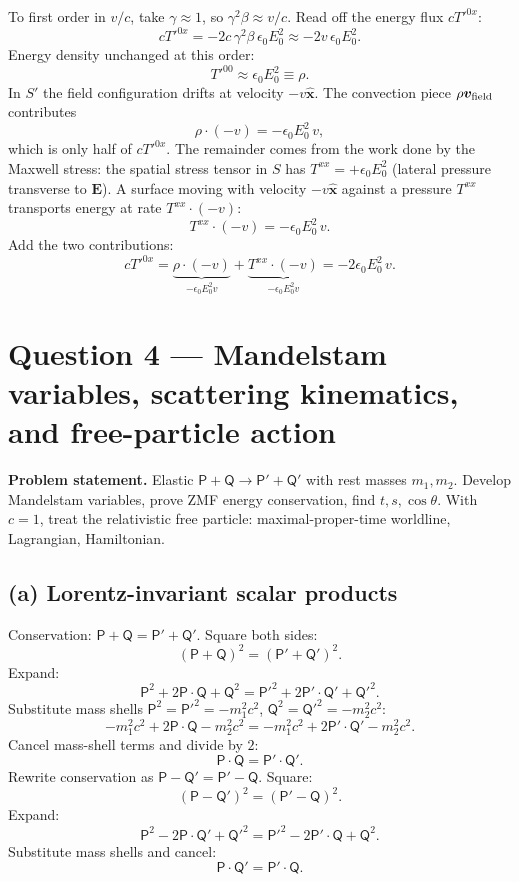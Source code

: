 \documentclass[11pt]{article}
\begin{document}
To first order in $v/c$, take $\gamma\approx 1$, so $\gamma^2\beta\approx v/c$. Read off the energy flux $cT'^{0x}$:
\[ cT'^{0x} = -2c\,\gamma^2\beta\,\epsilon_0 E_0^2 \approx -2v\,\epsilon_0 E_0^2. \]
Energy density unchanged at this order:
\[ T'^{00} \approx \epsilon_0 E_0^2 \equiv \rho. \]
In $S'$ the field configuration drifts at velocity $-v\hat{\bm x}$. The convection piece $\rho \bm v_{\rm field}$ contributes
\[ \rho\cdot(-v) = -\epsilon_0 E_0^2\,v, \]
which is only half of $cT'^{0x}$. The remainder comes from the work done by the Maxwell stress: the spatial stress tensor in $S$ has $T^{xx} = +\epsilon_0 E_0^2$ (lateral pressure transverse to $\bm E$). A surface moving with velocity $-v\hat{\bm x}$ against a pressure $T^{xx}$ transports energy at rate $T^{xx}\cdot(-v)$:
\[ T^{xx}\cdot(-v) = -\epsilon_0 E_0^2\,v. \]
Add the two contributions:
\begin{equation}
\boxed{cT'^{0x} = \underbrace{\rho\cdot(-v)}_{-\epsilon_0 E_0^2 v} + \underbrace{T^{xx}\cdot(-v)}_{-\epsilon_0 E_0^2 v} = -2\epsilon_0 E_0^2\,v.}
\end{equation}

\section*{Question 4 --- Mandelstam variables, scattering kinematics, and free-particle action}

\textbf{Problem statement.} Elastic $\mathsf P+\mathsf Q\to\mathsf P'+\mathsf Q'$ with rest masses $m_1,m_2$. Develop Mandelstam variables, prove ZMF energy conservation, find $t,s,\cos\theta$. With $c=1$, treat the relativistic free particle: maximal-proper-time worldline, Lagrangian, Hamiltonian.

\subsection*{(a) Lorentz-invariant scalar products}

Conservation: $\mathsf P+\mathsf Q=\mathsf P'+\mathsf Q'$. Square both sides:
\[ (\mathsf P+\mathsf Q)^2 = (\mathsf P'+\mathsf Q')^2. \]
Expand:
\[ \mathsf P^2 + 2\mathsf P\cdot\mathsf Q + \mathsf Q^2 = \mathsf P'^2 + 2\mathsf P'\cdot\mathsf Q' + \mathsf Q'^2. \]
Substitute mass shells $\mathsf P^2=\mathsf P'^2=-m_1^2 c^2$, $\mathsf Q^2=\mathsf Q'^2=-m_2^2 c^2$:
\[ -m_1^2 c^2 + 2\mathsf P\cdot\mathsf Q - m_2^2 c^2 = -m_1^2 c^2 + 2\mathsf P'\cdot\mathsf Q' - m_2^2 c^2. \]
Cancel mass-shell terms and divide by $2$:
\begin{equation}
\boxed{\mathsf P\cdot\mathsf Q = \mathsf P'\cdot\mathsf Q'.}
\end{equation}
Rewrite conservation as $\mathsf P-\mathsf Q'=\mathsf P'-\mathsf Q$. Square:
\[ (\mathsf P-\mathsf Q')^2 = (\mathsf P'-\mathsf Q)^2. \]
Expand:
\[ \mathsf P^2 - 2\mathsf P\cdot\mathsf Q' + \mathsf Q'^2 = \mathsf P'^2 - 2\mathsf P'\cdot\mathsf Q + \mathsf Q^2. \]
Substitute mass shells and cancel:
\begin{equation}
\boxed{\mathsf P\cdot\mathsf Q' = \mathsf P'\cdot\mathsf Q.}
\end{equation}
\end{document}
